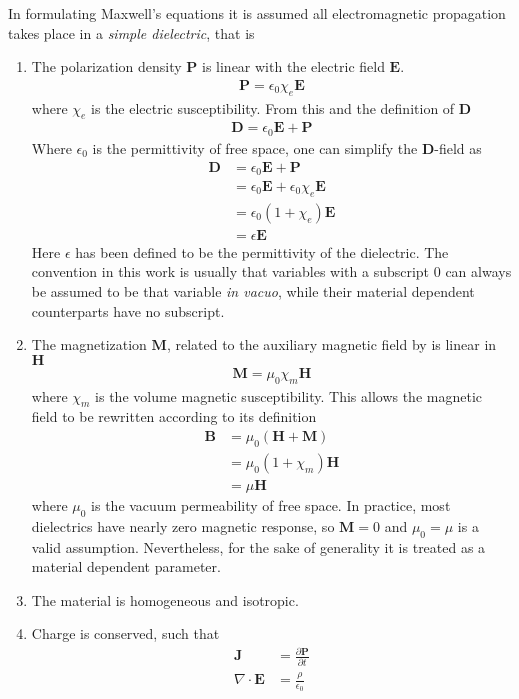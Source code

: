 In formulating Maxwell's equations it is assumed all electromagnetic
propagation takes place in a {\it simple dielectric}, that is
\begin{enumerate}
\item The polarization density $\mathbf{P}$ is linear with the electric
field $\mathbf{E}$.  
\begin{align}
\mathbf{P}=\epsilon_0\chi_e\mathbf{E}
\label{eqn:pdensity}
\end{align}
where $\chi_e$ is the electric susceptibility.  From this and the definition
of $\mathbf{D}$
\begin{align}
\mathbf{D}=\epsilon_0\mathbf{E}+\mathbf{P}
\label{eqn:dfield}
\end{align}
Where $\epsilon_0$ is the permittivity of free space, one can simplify the
$\mathbf{D}$-field as 
\begin{align}
\mathbf{D}&=\epsilon_0\mathbf{E}+\mathbf{P}\\
&=\epsilon_0 \mathbf{E}+\epsilon_0 \chi_e \mathbf{E}\\
&=\epsilon_0(1+\chi_e)\mathbf{E}\\
&=\epsilon\mathbf{E}
\end{align}
Here $\epsilon$ has been defined to be the permittivity of the
dielectric.  The convention in this work is usually that variables with a
subscript $0$ can always be assumed to be that variable {\it in vacuo},
while their material dependent counterparts have no subscript.
\item The magnetization $\mathbf{M}$, related to the auxiliary magnetic
field by is linear in $\mathbf{H}$
\begin{align}
\mathbf{M}=\mu_0\chi_m\mathbf{H}
\end{align}
where $\chi_m$ is the volume magnetic susceptibility.  This allows the
magnetic field to be rewritten according to its definition
\begin{align}
\mathbf{B}&=\mu_0\left(\mathbf{H}+\mathbf{M}\right)\\
&=\mu_0\left(1+\chi_m\right)\mathbf{H}\\
&=\mu \mathbf{H}
\end{align}
where $\mu_0$ is the vacuum permeability of free space.  In practice, most
dielectrics have nearly zero magnetic response, so $\mathbf{M}=0$ and
$\mu_0=\mu$ is a valid assumption.  Nevertheless, for the sake of generality it is treated as a
material dependent parameter.
\item The material is homogeneous and isotropic.
\item Charge is conserved, such that
\begin{align}
\mathbf{J} &= \frac{\partial\mathbf{P}}{\partial t}\\
\nabla \cdot \mathbf{E} &= \frac{\rho}{\epsilon_0}
\end{align}
\end{enumerate}
